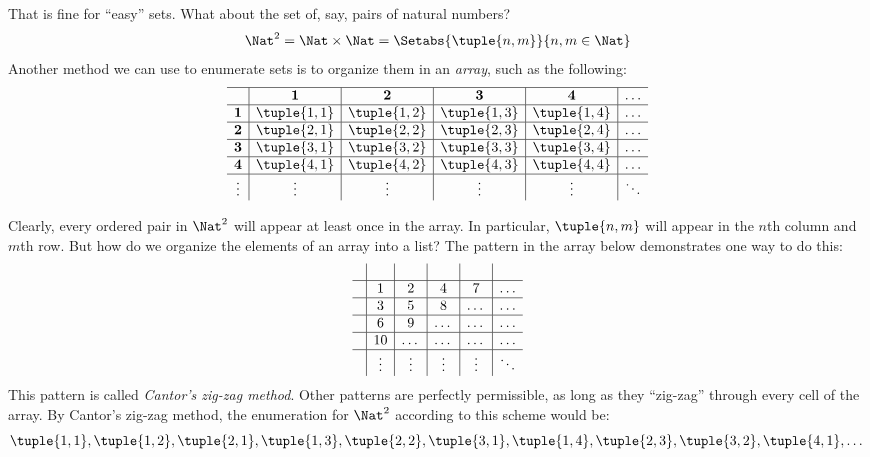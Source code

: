 \documentclass[../../include/open-logic-section]{subfiles}
\begin{document}
\begin{explain}
That is fine for ``easy'' sets. What about the set of, say, pairs of 
natural numbers?
\[ 
\Nat^2 = \Nat \times \Nat = \Setabs{\tuple{n,m}}{n,m \in \Nat}
\]
Another method we can use to enumerate sets is to organize them 
in an \emph{array}, such as the following:
\[
\begin{array}{ c | c | c | c | c | c}
\hline
& \textbf 1 & \textbf 2 & \textbf 3 & \textbf 4 & \dots \\
\hline
\textbf 1 & \tuple{1,1} & \tuple{1,2} & \tuple{1,3} & \tuple{1,4} & \dots \\
\hline
\textbf 2 & \tuple{2,1} & \tuple{2,2} & \tuple{2,3} & \tuple{2,4} & \dots \\
\hline
\textbf 3 & \tuple{3,1} & \tuple{3,2} & \tuple{3,3} & \tuple{3,4} & \dots \\
\hline
\textbf 4 & \tuple{4,1} & \tuple{4,2} & \tuple{4,3} & \tuple{4,4} & \dots \\
\hline
\vdots & \vdots & \vdots & \vdots & \vdots & \ddots\\
\end{array}
\]

Clearly, every ordered pair in $\Nat^2$ will appear at least 
once in the array. In particular, $\tuple{n,m}$ will appear in the $n$th 
column and $m$th row. But how do we organize the elements of an 
array into a list? The pattern in the array below demonstrates one 
way to do this:
\[
\begin{array}{ c | c | c | c | c | c }
& & & & & \\
\hline
& 1 & 2 & 4 & 7 & \dots \\
\hline
& 3 & 5 & 8 & \dots & \dots \\
\hline
& 6 & 9 & \dots & \dots & \dots \\
\hline
& 10 & \dots & \dots & \dots & \dots \\
\hline
& \vdots & \vdots & \vdots & \vdots & \ddots\\ 
\end{array}
\]
This pattern is called \emph{Cantor's zig-zag method}. Other 
patterns are perfectly permissible, as long as they ``zig-zag'' 
through every cell of the array. By Cantor's zig-zag method, the 
enumeration for $\Nat^2$ according to this scheme would be:
\[
\tuple{1,1}, \tuple{1,2}, \tuple{2,1}, \tuple{1,3}, \tuple{2,2}, \tuple{3,1}, \tuple{1,4}, \tuple{2,3}, \tuple{3,2}, \tuple{4,1}, \dots
\]


\end{explain}
\end{document}
